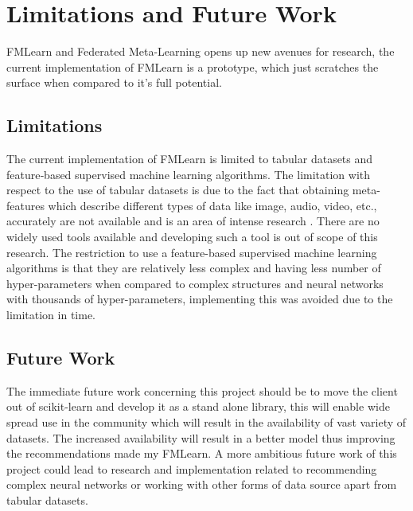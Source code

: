 \chapter{Limitations and Future Work}

FMLearn and Federated Meta-Learning opens up new avenues for research, the current implementation of FMLearn is a prototype, which just scratches the surface when compared to it's full potential.

\section*{Limitations}

The current implementation of FMLearn is limited to tabular datasets and feature‐based supervised machine learning algorithms. The limitation with respect to the use of tabular datasets is due to the fact that obtaining meta-features which describe different types of data like image, audio, video, etc., accurately are not available and is an area of intense research \citep{image-meta-data} \citep{image-meta-data-2}. There are no widely used tools available and developing such a tool is out of scope of this research. The restriction to use a feature-based supervised machine learning algorithms is that they are relatively less complex and having less number of hyper-parameters when compared to complex structures and neural networks with thousands of hyper-parameters, implementing this was avoided due to the limitation in time.

\section*{Future Work}

The immediate future work concerning this project should be to move the client out of scikit-learn and develop it as a stand alone library, this will enable wide spread use in the community which will result in the availability of vast variety of datasets. The increased availability will result in a better model thus improving the recommendations made my FMLearn. A more ambitious future work of this project could lead to research and implementation related to recommending complex neural networks or working with other forms of data source apart from tabular datasets.